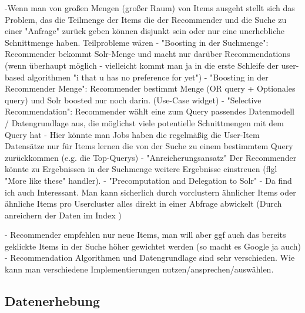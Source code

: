 -Wenn man von großen Mengen (großer Raum) von Items ausgeht stellt sich das Problem, das die Teilmenge der Items die der Recommender und die Suche zu einer "Anfrage" zurück geben können disjunkt sein oder nur eine unerhebliche Schnittmenge haben. Teilprobleme wären
   - "Boosting in der Suchmenge": Recommender bekommt Solr-Menge und macht nur darüber Recommendations (wenn überhaupt möglich - vielleicht kommt man ja in die erste Schleife der user-based algorithmen "i that u has no preference for yet")
   - "Boosting in der Recommender Menge": Recommender bestimmt Menge (OR query + Optionales query) und Solr boosted nur noch darin. (Use-Case widget)
   -  "Selective Recommendation": Recommender wählt eine zum Query passendes Datenmodell / Datengrundlage aus, die möglichst viele potentielle Schnittmengen mit dem Query hat
       - Hier könnte man Jobs haben die regelmäßig die User-Item Datensätze nur für Items lernen die von der Suche zu einem bestimmtem Query zurückkommen (e.g. die Top-Querys)
   - "Anreicherungsansatz" Der Recommender könnte zu Ergebnissen in der Suchmenge weitere Ergebnisse einstreuen (flgl "More like these" handler).
   - "Precomputation and Delegation to Solr"
- Da find ich auch Interessant. Man kann sicherlich durch vorclustern ähnlicher Items oder ähnliche Items pro Usercluster alles direkt in einer Abfrage abwickelt  (Durch anreichern der Daten im Index )

- Recommender empfehlen nur neue Items, man will aber ggf auch das bereits geklickte Items in der Suche höher gewichtet werden (so macht es Google ja auch)
- Recommendation Algorithmen und Datengrundlage sind sehr verschieden. Wie kann man verschiedene Implementierungen nutzen/ansprechen/auswählen.


\subsection{Datenerhebung}\newpage

